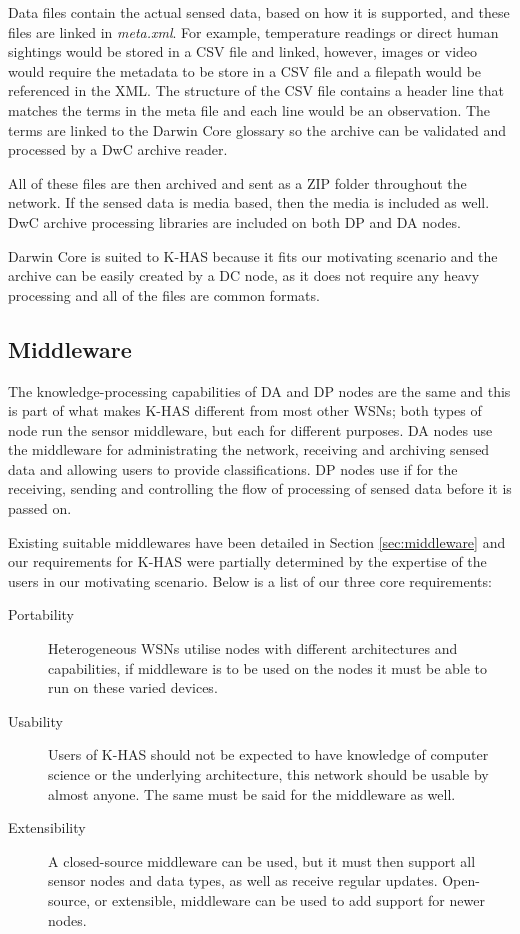 

Data files contain the actual sensed data, based on how it is supported, and these files are linked in \textit{meta.xml}. For example, temperature readings or direct human sightings would be stored in a CSV file and linked, however, images or video would require the metadata to be store in a CSV file and a filepath would be referenced in the XML. The structure of the CSV file contains a header line that matches the terms in the meta file and each line would be an observation. The terms are linked to the Darwin Core glossary so the archive can be validated and processed by a DwC archive reader.

All of these files are then archived and sent as a ZIP folder throughout the network. If the sensed data is media based, then the media is included as well. DwC archive processing libraries are included on both DP and DA nodes.

Darwin Core is suited to K-HAS because it fits our motivating scenario and the archive can be easily created by a DC node, as it does not require any heavy processing and all of the files are common formats.
	
	\subsection{Middleware}
	The knowledge-processing capabilities of DA and DP nodes are the same and this is part of what makes K-HAS different from most other WSNs; both types of node run the sensor middleware, but each for different purposes. DA nodes use the middleware for administrating the network, receiving and archiving sensed data and allowing users to provide classifications. DP nodes use if for the receiving, sending and controlling the flow of processing of sensed data before it is passed on.
	
	Existing suitable middlewares have been detailed in Section \ref{sec:middleware} and our requirements for K-HAS were partially determined by the expertise of the users in our motivating scenario. Below is a list of our three core requirements:
	\begin{description}
		\item[Portability] Heterogeneous WSNs utilise nodes with different architectures and capabilities, if middleware is to be used on the nodes it must be able to run on these varied devices. 
		\item[Usability] Users of K-HAS should not be expected to have knowledge of computer science or the underlying architecture, this network should be usable by almost anyone. The same must be said for the middleware as well.
		\item[Extensibility] A closed-source middleware can be used, but it must then support all sensor nodes and data types, as well as receive regular updates. Open-source, or extensible, middleware can be used to add support for newer nodes.
	\end{description}
	
